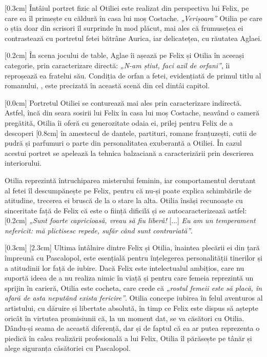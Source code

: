 [0.3cm]
Întâiul portret fizic al Otiliei este realizat din perspectiva lui Felix, pe care ea îl primește cu căldură în casa lui moș Costache. \textit{„Verișoara”} Otilia pe care o știa doar din scrisori îl surprinde în mod plăcut, mai ales că frumusețea ei contrastează cu portretul fetei bătrâne Aurica, iar delicatețea, cu răutatea Aglaei.

[0.2cm]
În scena jocului de table, Aglae îi așează pe Felix și Otilia în aceeași categorie, prin caracterizare directă: \textit{„N-am știut, faci azil de orfani”}, îi reproșează ea fratelui său. Condiția de orfan a fetei, evidențiată de primul titlu al romanului, , este precizată în această scenă din cel dintâi capitol.

[0.0cm]
Portretul Otiliei se conturează mai ales prin caracterizare indirectă. Astfel, încă din seara sosirii lui Felix în casa lui moș Costache, neavând o cameră pregătită, Otilia îi oferă cu generozitate odaia ei, prilej pentru Felix de a descoperi
[0.8cm]
în amestecul de dantele, partituri, romane franțuzești, cutii de pudră și parfumuri o parte din personalitatea exuberantă a Otiliei. În cazul acestui portret se apelează la tehnica balzaciană a caracterizării prin descrierea interiorului.

Otilia reprezintă întruchiparea misterului feminin, iar comportamentul   derutant al fetei îl descumpănește pe Felix, pentru că nu-și poate explica schimbările de atitudine, trecerea ei bruscă de la o stare la alta. Otilia însăși recunoaște cu sinceritate față de Felix că este o ființă dificilă și se autocaracterizează astfel:
[0.2cm]
\textit{„Sunt foarte capricioasă, vreau să fiu liberă!} [...] \textit{Eu am un temperament nefericit: mă plictisesc repede, sufăr când sunt contrariată”}.

[0.3cm]
[2.3cm]
Ultima întâlnire dintre Felix și Otilia, înaintea plecării ei din țară împreună cu Pascalopol, este esențială pentru înțelegerea personalității tinerilor și a atitudinii lor față de iubire. Dacă Felix este intelectualul ambițios, care nu suportă ideea de a nu realiza nimic în viață și pentru care femeia reprezintă un sprijin în carieră, Otilia este cocheta, care crede că \textit{„rostul femeii este să placă, în afară de asta neputând exista fericire”}. Otilia concepe iubirea în felul aventuros al artistului, cu dăruire și libertate absolută, în timp ce Felix este dispus să aștepte oricât în virtutea promisiunii că, la un moment dat, se va căsători cu Otilia. Dându-și seama de această diferență, dar și de faptul că ea ar putea reprezenta o piedică în calea realizării profesională a lui Felix, Otilia îl părăsește pe tânăr și alege siguranța căsătoriei cu Pascalopol.


